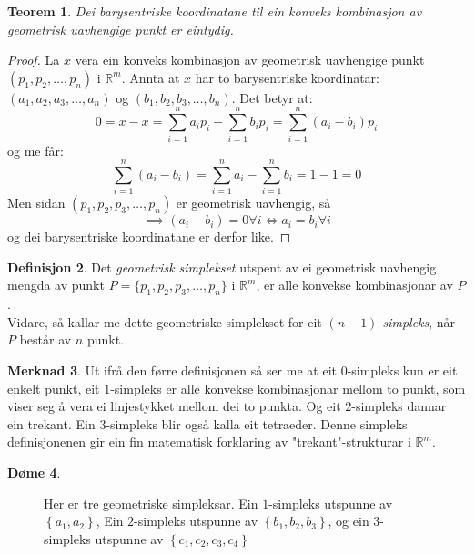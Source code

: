 \documentclass[a4paper, titlepage, 12pt, norsk]{article}
\theoremstyle{plain}
\newtheorem{theorem}{Teorem}[section]
\theoremstyle{definition}
\newtheorem{definition}[theorem]{Definisjon}
\newtheorem{example}[theorem]{Døme}
\newtheorem{remark}[theorem]{Merknad}
\newcommand{\Rb}{\mathbb{R}}
\newcommand{\set}[1]{ \left \{ #1 \right \} } %
\newcommand{\tuple}[1]{ \left( #1 \right) } %
\begin{document}
\begin{theorem} \label{thm:unik-barysentrisk-koordinat}
	Dei barysentriske koordinatane til ein konveks kombinasjon av geometrisk uavhengige punkt er eintydig.
\end{theorem}

\begin{proof}
	La $x$ vera ein konveks kombinasjon av geometrisk uavhengige punkt \( \tuple{p_1, p_2, \dots, p_n} \) i $\Rb^m$. Annta at $x$ har to barysentriske koordinatar: $(a_1, a_2, a_3, \dots, a_n)$ og $(b_1, b_2, b_3, \dots, b_n)$. Det betyr at:
	\begin{equation*}
		0 = x - x = \sum_{i=1}^n a_ip_i - \sum_{i=1}^n b_ip_i=\sum_{i=1}^n (a_i-b_i)p_i
	\end{equation*}
	og me får:
	\begin{equation*}
		\sum_{i=1}^n(a_i-b_i)=\sum_{i=1}^na_i - \sum_{i=1}^nb_i = 1 - 1 = 0
	\end{equation*}
	Men sidan $(p_1, p_2, p_3, \dots, p_n)$ er geometrisk uavhengig, så 
	\begin{equation*}
		\implies (a_i-b_i)=0\forall i \Longleftrightarrow a_i = b_i \forall i
	\end{equation*}
	og dei barysentriske koordinatane er derfor like.
\end{proof}

\begin{definition}
	Det \emph{geometrisk simplekset} utspent av ei geometrisk uavhengig mengda av punkt $P=\{p_1, p_2, p_3, \dots, p_n\}$ i $\Rb^m$, er alle konvekse kombinasjonar av $P$.
	\\Vidare, så kallar me dette geometriske simplekset for eit \emph{$(n-1)$-simpleks}, når $P$ består av $n$ punkt.
\end{definition}

\begin{remark}
	Ut ifrå den førre definisjonen så ser me at eit $0$-simpleks kun er eit enkelt punkt, eit $1$-simpleks er alle konvekse kombinasjonar mellom to punkt, som viser seg å vera ei linjestykket mellom dei to punkta. Og eit $2$-simpleks dannar ein trekant. Ein $3$-simpleks blir også kalla eit tetraeder. Denne simpleks definisjonenen gir ein fin matematisk forklaring av "trekant"-strukturar i $\Rb^m$.
\end{remark}

\begin{example}
	\phantom{123}
	\begin{figure}[htbp]
		\begin{center}
			
			\caption{Her er tre geometriske simpleksar. Ein \( 1 \)-simpleks utspunne av \( \set{a_1, a_2} \), Ein \(2\)-simpleks utspunne av \( \set{b_1, b_2, b_3} \), og ein \(3\)-simpleks utspunne av \( \set{c_1, c_2, c_3, c_4} \)}
		\end{center}
	\end{figure}
\end{example}
\end{document}
